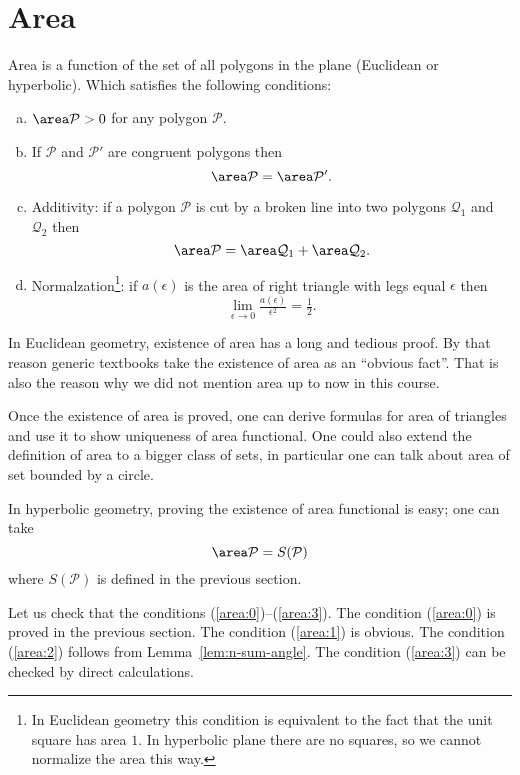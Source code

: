 {\section*{Area}\label{def:area}

Area is a function of the set of all polygons in the plane (Euclidean or hyperbolic).
Which satisfies the following conditions:

\begin{enumerate}[(a)]
\item\label{area:0} $\area\mathcal P>0$ for any polygon $\mathcal P$.
\item\label{area:1} If $\mathcal P$ and $\mathcal P'$ are congruent polygons then
$$\area\mathcal P=\area\mathcal P'.$$
\item\label{area:2}  Additivity:
 if a polygon $\mathcal{P}$ is cut by a broken line into two polygons 
$\mathcal{Q}_1$ and $\mathcal{Q}_2$ then
$$\area\mathcal{P}=
\area\mathcal{Q}_1+\area\mathcal{Q}_2.$$
\item\label{area:3}  Normalzation\footnote{In Euclidean geometry this condition is equivalent to the fact that the unit square has area $1$. In hyperbolic plane there are no squares, so we cannot normalize the area this way.}: if $a(\epsilon)$ is the area of right triangle with legs equal $\epsilon$ then
$$\lim_{\epsilon\to0} \tfrac{a(\epsilon)}{\epsilon^2}=\tfrac12.$$
\end{enumerate}

In Euclidean geometry, existence of area has a  long and tedious proof.
By that reason generic textbooks 
take the existence of area as an ``obvious fact''.
That is also the reason why we did not mention area up to now in this course.

Once the existence of area is proved, 
one can derive formulas for area of triangles and use it to show uniqueness of area functional.
One could also extend the definition of area to a bigger class of sets,
in particular one can talk about area of set bounded by a circle.

In hyperbolic geometry,
proving the existence of area functional is easy;
one can take 
$$\area\mathcal{P}= S(\mathcal{P})$$
where $S(\mathcal{P})$ is defined in the previous section.

Let us check that the conditions (\ref{area:0})--(\ref{area:3}).
The condition (\ref{area:0}) is proved in the previous section.
The condition (\ref{area:1}) is obvious.
The condition (\ref{area:2}) follows from Lemma~\ref{lem:n-sum-angle}.
The condition (\ref{area:3}) can be checked by direct calculations.
\qeds


}

